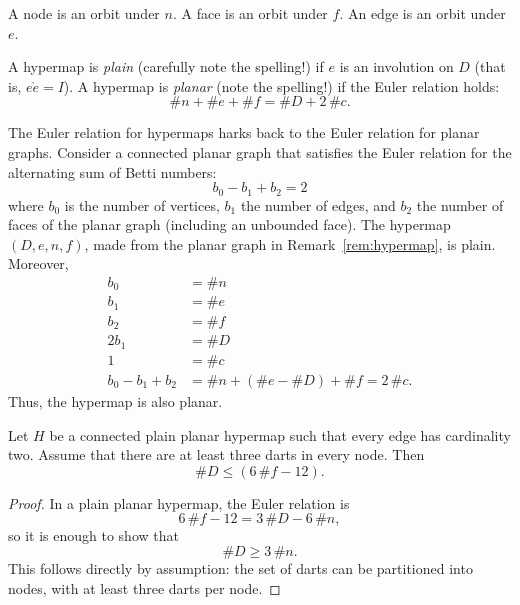 \begin{definition}  A node is an orbit  under $n$.  A face is an  orbit  under $f$.  An edge is an orbit under $e$. 
\end{definition}

\begin{definition} A hypermap is {\it plain} (carefully note the spelling!) if
$e$ is an involution on $D$ (that is, $e\ocirc e = I$).  A hypermap
is {\it planar} (note the spelling!) if the Euler relation holds:
    $$\# n + \# e + \# f = \# D + 2\, \#c.$$
\end{definition}


\begin{remark}\label{rem:Euler}  The Euler relation for hypermaps harks back
to the Euler relation for planar graphs.
Consider a connected planar graph that satisfies the
Euler relation for the alternating sum of Betti numbers:
    $$b_0 - b_1 + b_2 = 2$$
where $b_0$ is the number of vertices, $b_1$ the number of edges, and
$b_2$ the number of faces of the planar graph (including an unbounded face). The
hypermap $(D,e,n,f)$, made from the planar graph in
Remark~\ref{rem:hypermap}, is plain.
Moreover,
    $$\begin{array}{lll}
    b_0 &= \# n\\
    b_1 &= \# e\\
    b_2 &= \# f\\
    2b_1 &= \# D\\
    1 &= \#c\\
    b_0 - b_1 + b_2  &= \# n + (\#e - \#D) + \# f = 2\,\# c.
    \end{array}
    $$
Thus, the hypermap is also planar.
\end{remark}


\begin{lemma}\label{lemma:dart-upper} 
Let $H$ be a connected plain planar hypermap such that every edge has cardinality two.  Assume that
there are at least three darts in every node.  Then
$$
\# D \le (6\, \#f - 12).
$$
\end{lemma}

\begin{proof}  In a plain planar hypermap, the Euler relation is
$$6\, \#f - 12 = 3\,\#D - 6\,\#n,$$
so it is enough to show that
$$
\# D \ge 3\,\#n.
$$
This follows directly by assumption: the set of darts can be partitioned into nodes, with at least three darts per node.
\end{proof}



